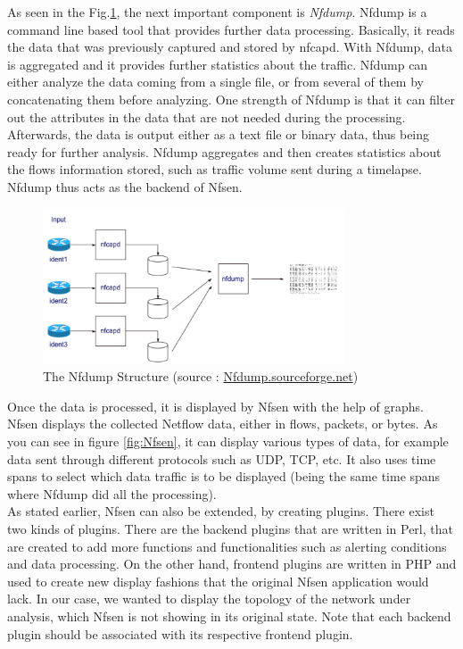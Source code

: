 As seen in the Fig.\ref{fig:Nfdump}, the next important component is \textit{Nfdump}. Nfdump is a command line based tool that provides further data processing. Basically, it reads the data that was previously captured and stored by nfcapd. With Nfdump, data is aggregated and it provides further statistics about the traffic. Nfdump can either analyze the data coming from a single file, or from several of them by concatenating them before analyzing. One strength of Nfdump is that it can filter out the attributes in the data that are not needed during the processing. Afterwards, the data is output either as a text file or binary data, thus being ready for further analysis. Nfdump aggregates and then creates statistics about the flows information stored, such as traffic volume sent during a timelapse. Nfdump thus acts as the backend of Nfsen.\\

\begin{figure}[!h]
	\centering
	\includegraphics[width=0.8\textwidth]{res/nfdump.png}
	\caption{The Nfdump Structure (source : \url{Nfdump.sourceforge.net})}
	\label{fig:Nfdump}
\end{figure}

Once the data is processed, it is displayed by Nfsen with the help of graphs. Nfsen displays the collected Netflow data, either in flows, packets, or bytes. As you can see in figure \ref{fig:Nfsen}, it can display various types of data, for example data sent through different protocols such as UDP, TCP, etc. It also uses time spans to select which data traffic is to be displayed (being the same time spans where Nfdump did all the processing).\\

As stated earlier, Nfsen can also be extended, by creating plugins. There exist two kinds of plugins. There are the backend plugins that are written in Perl, that are created to add more functions and functionalities such as alerting conditions and data processing. On the other hand, frontend plugins are written in PHP and used to create new display fashions that the original Nfsen application would lack. In our case, we wanted to display the topology of the network under analysis, which Nfsen is not showing in its original state. Note that each backend plugin should be associated with its respective frontend plugin.

